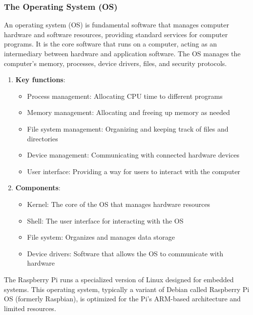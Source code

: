 \documentclass[
]{article}
\providecommand{\tightlist}{%
  \setlength{\itemsep}{0pt}\setlength{\parskip}{0pt}}\usepackage{longtable,booktabs,array}
\begin{document}
\subsubsection{The Operating System
(OS)}\label{sec-setup-operating-system-os-2d84}

An operating system (OS) is fundamental software that manages computer
hardware and software resources, providing standard services for
computer programs. It is the core software that runs on a computer,
acting as an intermediary between hardware and application software. The
OS manages the computer's memory, processes, device drivers, files, and
security protocols.

\begin{enumerate}
\def\labelenumi{\arabic{enumi}.}
\tightlist
\item
  \textbf{Key functions}:

  \begin{itemize}
  \tightlist
  \item
    Process management: Allocating CPU time to different programs
  \item
    Memory management: Allocating and freeing up memory as needed
  \item
    File system management: Organizing and keeping track of files and
    directories
  \item
    Device management: Communicating with connected hardware devices
  \item
    User interface: Providing a way for users to interact with the
    computer
  \end{itemize}
\item
  \textbf{Components}:

  \begin{itemize}
  \tightlist
  \item
    Kernel: The core of the OS that manages hardware resources
  \item
    Shell: The user interface for interacting with the OS
  \item
    File system: Organizes and manages data storage
  \item
    Device drivers: Software that allows the OS to communicate with
    hardware
  \end{itemize}
\end{enumerate}

The Raspberry Pi runs a specialized version of Linux designed for
embedded systems. This operating system, typically a variant of Debian
called Raspberry Pi OS (formerly Raspbian), is optimized for the Pi's
ARM-based architecture and limited resources.
\end{document}
